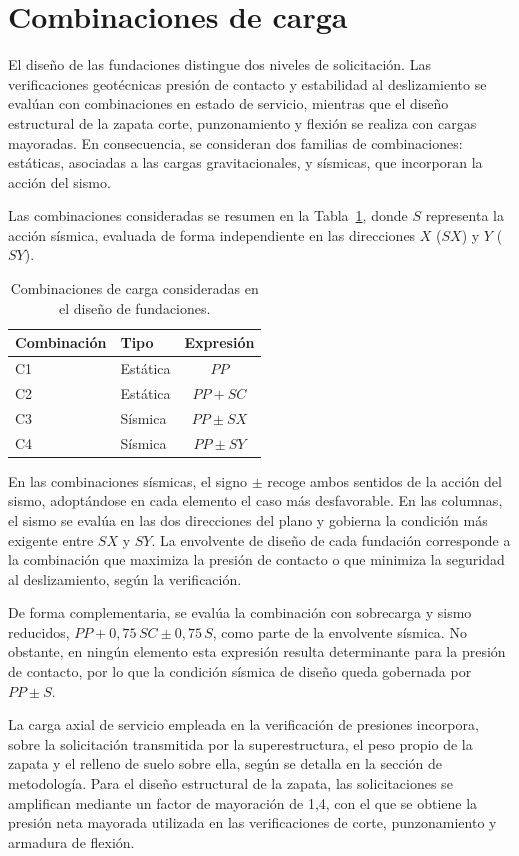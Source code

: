\section{Combinaciones de carga}

El diseño de las fundaciones distingue dos niveles de solicitación. Las verificaciones geotécnicas presión de contacto y estabilidad al deslizamiento se evalúan con combinaciones en estado de servicio, mientras que el diseño estructural de la zapata corte, punzonamiento y flexión se realiza con cargas mayoradas. En consecuencia, se consideran dos familias de combinaciones: estáticas, asociadas a las cargas gravitacionales, y sísmicas, que incorporan la acción del sismo.

Las combinaciones consideradas se resumen en la Tabla~\ref{tab:combinaciones}, donde $S$ representa la acción sísmica, evaluada de forma independiente en las direcciones $X$ ($SX$) y $Y$ ($SY$).

\begin{table}[H]
\centering
\caption{Combinaciones de carga consideradas en el diseño de fundaciones.}
\label{tab:combinaciones}
\begin{tabular}{llc}
\hline
Combinación & Tipo & Expresión \\
\hline
C1 & Estática & $PP$ \\
C2 & Estática & $PP + SC$ \\
C3 & Sísmica & $PP \pm SX$ \\
C4 & Sísmica & $PP \pm SY$ \\
\hline
\end{tabular}
\end{table}

En las combinaciones sísmicas, el signo $\pm$ recoge ambos sentidos de la acción del sismo, adoptándose en cada elemento el caso más desfavorable. En las columnas, el sismo se evalúa en las dos direcciones del plano y gobierna la condición más exigente entre $SX$ y $SY$. La envolvente de diseño de cada fundación corresponde a la combinación que maximiza la presión de contacto o que minimiza la seguridad al deslizamiento, según la verificación.

De forma complementaria, se evalúa la combinación con sobrecarga y sismo reducidos, $PP + 0,75\,SC \pm 0,75\,S$, como parte de la envolvente sísmica. No obstante, en ningún elemento esta expresión resulta determinante para la presión de contacto, por lo que la condición sísmica de diseño queda gobernada por $PP \pm S$.

La carga axial de servicio empleada en la verificación de presiones incorpora, sobre la solicitación transmitida por la superestructura, el peso propio de la zapata y el relleno de suelo sobre ella, según se detalla en la sección de metodología. Para el diseño estructural de la zapata, las solicitaciones se amplifican mediante un factor de mayoración de 1,4, con el que se obtiene la presión neta mayorada utilizada en las verificaciones de corte, punzonamiento y armadura de flexión.